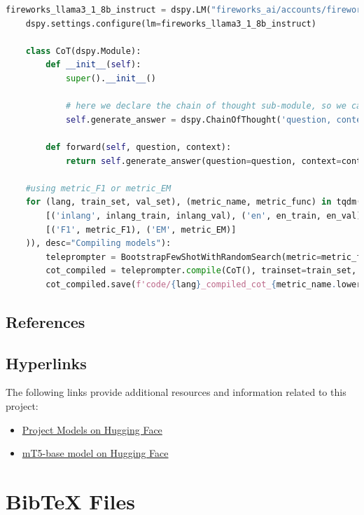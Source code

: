 \documentclass[11pt]{article}
\begin{document}
\begin{lstlisting}[language=Python, label=lst:dspy_setup] 
    fireworks_llama3_1_8b_instruct = dspy.LM("fireworks_ai/accounts/fireworks/models/llama-v3p1-8b-instruct")
    dspy.settings.configure(lm=fireworks_llama3_1_8b_instruct)
        
    class CoT(dspy.Module):  
        def __init__(self):
            super().__init__()
    
            # here we declare the chain of thought sub-module, so we can later compile it (e.g., teach it a prompt)
            self.generate_answer = dspy.ChainOfThought('question, context -> answer')
        
        def forward(self, question, context):
            return self.generate_answer(question=question, context=context)
    
    #using metric_F1 or metric_EM
    for (lang, train_set, val_set), (metric_name, metric_func) in tqdm(list(product(
        [('inlang', inlang_train, inlang_val), ('en', en_train, en_val)],
        [('F1', metric_F1), ('EM', metric_EM)]
    )), desc="Compiling models"):
        teleprompter = BootstrapFewShotWithRandomSearch(metric=metric_func, max_bootstrapped_demos=1)
        cot_compiled = teleprompter.compile(CoT(), trainset=train_set, valset=val_set)
        cot_compiled.save(f'code/{lang}_compiled_cot_{metric_name.lower()}.json')
\end{lstlisting}



\subsection{References}


\subsection{Hyperlinks}
The following links provide additional resources and information related to this project:

\begin{itemize}
    \item \href{https://huggingface.co/hanspeterlyngsoeraaschoujensen}{Project Models on Hugging Face}\label{project_models_huggingface}
    \item \href{https://huggingface.co/google/mt5-base}{mT5-base model on Hugging Face}\label{mt5_base_model_huggingface}
\end{itemize}

\nocite{Ando2005,andrew2007scalable,rasooli-tetrault-2015, rajpurkar-etal-2018-know, hu2021loralowrankadaptationlarge, risch2021semanticanswersimilarityevaluating}
\section{Bib\TeX{} Files}
\label{sec:bibtex}

\end{document}
